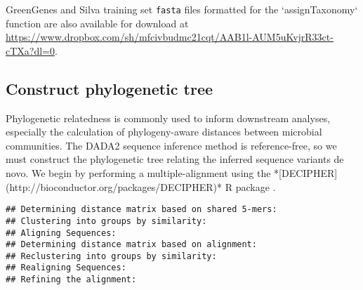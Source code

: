 \begin{knitrout}
\color{fgcolor}\begin{kframe}
\begin{alltt}
 \hlkwb{<-} 
 \hlkwb{<-}   
 \hlkwb{<-} \hlstd{(}\hlstd{,} \hlstd{,} \hlstd{,} \hlstd{,} \hlstd{,} \hlstd{)}
\end{alltt}
\end{kframe}
\end{knitrout}

GreenGenes and Silva training set {\tt fasta} files formatted for the
`assignTaxonomy` function are also available for download at
\url{https://www.dropbox.com/sh/mfcivbudmc21cqt/AAB1l-AUM5uKvjrR33ct-cTXa?dl=0}.

\subsection*{Construct phylogenetic tree}
Phylogenetic relatedness is commonly used to inform downstream
analyses, especially the calculation of phylogeny-aware distances
between microbial communities. The DADA2 sequence inference method is
reference-free, so we must construct the phylogenetic tree relating
the inferred sequence variants de novo. We begin by performing a
multiple-alignment using the *[DECIPHER](http://bioconductor.org/packages/DECIPHER)* R package
\cite{wright2015decipher}.

\begin{knitrout}
\color{fgcolor}\begin{kframe}
\begin{alltt}
 \hlkwb{<-} 
 \hlkwb{<-}  
 \hlkwb{<-} \hlstd{(} \hlstd{=}\hlstd{)}
\end{alltt}
\begin{verbatim}
## Determining distance matrix based on shared 5-mers:
## Clustering into groups by similarity:
## Aligning Sequences:
## Determining distance matrix based on alignment:
## Reclustering into groups by similarity:
## Realigning Sequences:
## Refining the alignment:
\end{verbatim}
\end{kframe}
\end{knitrout}

